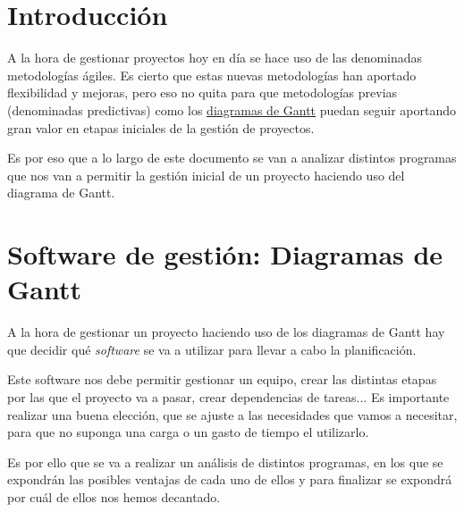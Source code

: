 \documentclass{\ClassPath/viu-tfm-template}
\begin{document}
    \graphicspath{{../VIU_TFM_LaTeX_template/}}

    \coverpage

    \tableofcontents

\chapter{Introducción}

A la hora de gestionar proyectos hoy en día se hace uso de las denominadas metodologías ágiles. Es cierto que estas nuevas metodologías han aportado flexibilidad y mejoras, pero eso no quita para que metodologías previas (denominadas predictivas) como los \href{https://es.wikipedia.org/wiki/Diagrama_de_Gantt}{diagramas de Gantt} puedan seguir aportando gran valor en etapas iniciales de la gestión de proyectos.

Es por eso que a lo largo de este documento se van a analizar distintos programas que nos van a permitir la gestión inicial de un proyecto haciendo uso del diagrama de Gantt.


\chapter{Software de gestión: Diagramas de Gantt}
A la hora de gestionar un proyecto haciendo uso de los diagramas de Gantt hay que decidir qué \textit{software} se va a utilizar para llevar a cabo la planificación.

Este software nos debe permitir gestionar un equipo, crear las distintas etapas por las que el proyecto va a pasar, crear dependencias de tareas... Es importante realizar una buena elección, que se ajuste a las necesidades que vamos a necesitar, para que no suponga una carga o un gasto de tiempo el utilizarlo.

Es por ello que se va a realizar un análisis de distintos programas, en los que se expondrán las posibles ventajas de cada uno de ellos y para finalizar se expondrá por cuál de ellos nos hemos decantado.
\end{document}
